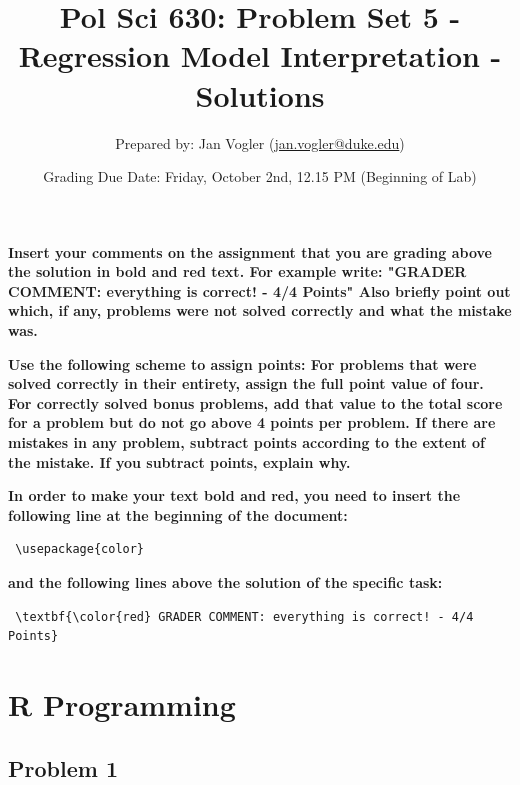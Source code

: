 \documentclass[12pt]{article}\usepackage[]{graphicx}\usepackage[]{color}
\begin{document}
\title{Pol Sci 630: Problem Set 5 - Regression Model Interpretation - Solutions}

\author{Prepared by: Jan Vogler (\href{mailto:jan.vogler@duke.edu}{jan.vogler@duke.edu})}

\date{Grading Due Date: Friday, October 2nd, 12.15 PM (Beginning of Lab)}
 
\maketitle



\textbf{\color{red} Insert your comments on the assignment that you are grading above the solution in bold and red text. For example write: "GRADER COMMENT: everything is correct! - 4/4 Points" Also briefly point out which, if any, problems were not solved correctly and what the mistake was.}

\bigskip

\textbf{Use the following scheme to assign points: For problems that were solved correctly in their entirety, assign the full point value of four. For correctly solved bonus problems, add that value to the total score for a problem but do not go above 4 points per problem. If there are mistakes in any problem, subtract points according to the extent of the mistake. If you subtract points, explain why.}

\bigskip

\textbf{In order to make your text bold and red, you need to insert the following line at the beginning of the document:}

\begin{verbatim} \usepackage{color} \end{verbatim}

\textbf{and the following lines above the solution of the specific task:}

\begin{verbatim} \textbf{\color{red} GRADER COMMENT: everything is correct! - 4/4 Points} \end{verbatim}



\pagebreak

\section*{R Programming}

\subsection*{Problem 1}
\end{document}
